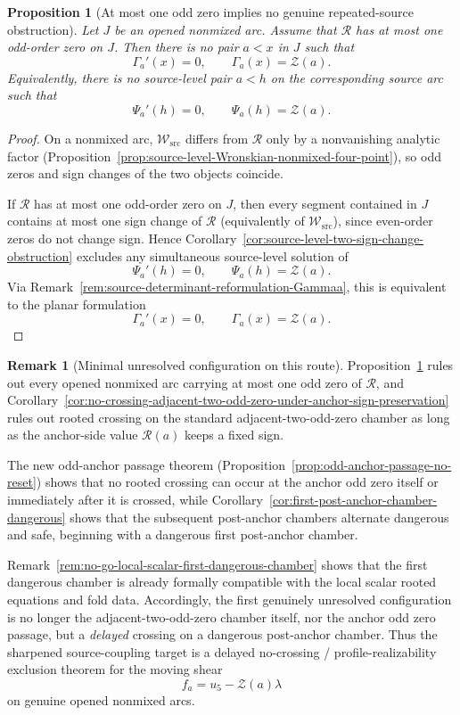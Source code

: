 \documentclass[11pt,a4paper]{amsart}
\theoremstyle{plain}
\newtheorem{proposition}[theorem]{Proposition}
\theoremstyle{definition}
\newtheorem{remark}[theorem]{Remark}
\begin{document}
\begin{proposition}[At most one odd zero implies no genuine repeated-source obstruction]
\label{prop:at-most-one-odd-zero-no-genuine-repeated-source-obstruction}
Let $J$ be an opened nonmixed arc. Assume that $\mathcal R$ has at most one
odd-order zero on $J$. Then there is no pair $a<x$ in $J$ such that
\[
\Gamma_a'(x)=0,
\qquad
\Gamma_a(x)=\mathcal Z(a).
\]
Equivalently, there is no source-level pair $a<h$ on the corresponding source
arc such that
\[
\Psi_a'(h)=0,
\qquad
\Psi_a(h)=\mathcal Z(a).
\]
\end{proposition}

\begin{proof}
On a nonmixed arc, $\mathcal W_{\mathrm{src}}$ differs from $\mathcal R$ only
by a nonvanishing analytic factor
(Proposition~\ref{prop:source-level-Wronskian-nonmixed-four-point}), so odd
zeros and sign changes of the two objects coincide.

If $\mathcal R$ has at most one odd-order zero on $J$, then every segment
contained in $J$ contains at most one sign change of $\mathcal R$ (equivalently
of $\mathcal W_{\mathrm{src}}$), since even-order zeros do not change sign.
Hence Corollary~\ref{cor:source-level-two-sign-change-obstruction} excludes any
simultaneous source-level solution of
\[
\Psi_a'(h)=0,
\qquad
\Psi_a(h)=\mathcal Z(a).
\]
Via Remark~\ref{rem:source-determinant-reformulation-Gammaa}, this is
equivalent to the planar formulation
\[
\Gamma_a'(x)=0,
\qquad
\Gamma_a(x)=\mathcal Z(a).
\]
\end{proof}

\begin{remark}[Minimal unresolved configuration on this route]
\label{rem:minimal-unresolved-configuration-repeated-source}
Proposition~\ref{prop:at-most-one-odd-zero-no-genuine-repeated-source-obstruction}
rules out every opened nonmixed arc carrying at most one odd zero of
$\mathcal R$, and
Corollary~\ref{cor:no-crossing-adjacent-two-odd-zero-under-anchor-sign-preservation}
rules out rooted crossing on the standard adjacent-two-odd-zero chamber as long
as the anchor-side value $\mathcal R(a)$ keeps a fixed sign.

The new odd-anchor passage theorem
(Proposition~\ref{prop:odd-anchor-passage-no-reset})
shows that no rooted crossing can occur at the anchor odd zero itself or
immediately after it is crossed, while
Corollary~\ref{cor:first-post-anchor-chamber-dangerous}
shows that the subsequent post-anchor chambers alternate dangerous and safe,
beginning with a dangerous first post-anchor chamber.

Remark~\ref{rem:no-go-local-scalar-first-dangerous-chamber} shows that the
first dangerous chamber is already formally compatible with the local scalar
rooted equations and fold data. Accordingly, the first genuinely unresolved
configuration is no longer the adjacent-two-odd-zero chamber itself, nor the
anchor odd zero passage, but a \emph{delayed} crossing on a dangerous
post-anchor chamber. Thus the sharpened source-coupling target is a delayed
no-crossing / profile-realizability exclusion theorem for the moving shear
\[
f_a=u_5-\mathcal Z(a)\lambda
\]
on genuine opened nonmixed arcs.
\end{remark}
\end{document}
